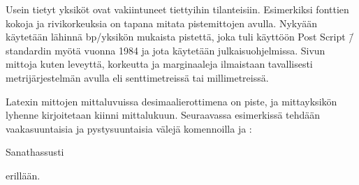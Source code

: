 
Usein tietyt yksiköt ovat vakiintuneet tiettyihin tilanteisiin.
Esimerkiksi fonttien kokoja ja rivikorkeuksia on tapana mitata
pistemittojen avulla. Nykyään käytetään lähinnä bp\-/yksikön mukaista
pistettä, joka tuli käyttöön Post Script \=/standardin myötä vuonna 1984
ja jota käytetään julkaisuohjelmissa. Sivun mittoja kuten leveyttä,
korkeutta ja marginaaleja ilmaistaan tavallisesti metrijärjestelmän
avulla eli senttimetreissä tai millimetreissä.

Latexin mittojen mittaluvuissa desi\-maa\-li\-erot\-ti\-me\-na on piste,
ja mittayksikön lyhenne kirjoitetaan kiinni mittalukuun. Seuraavassa
esimerkissä tehdään vaakasuuntaisia ja pystysuuntaisia välejä
komennoilla  ja :


\begin{koodilohkosis}
  Sanat\hspace{1.2cm}hassusti
  \vspace{2mm}

  \hspace{1.75em}erillään.
\end{koodilohkosis}


